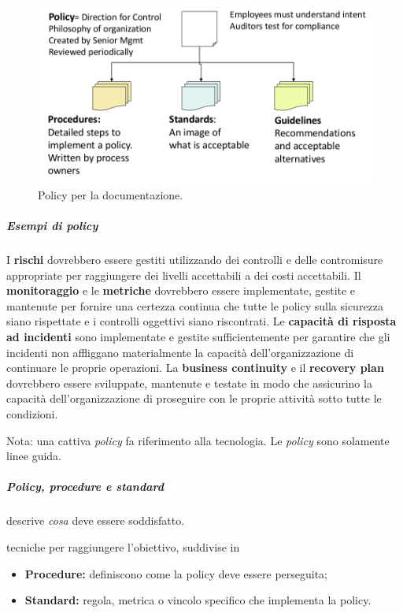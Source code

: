 \begin{figure}[h!]
        \begin{center}
                \includegraphics[scale=0.4]{res/img/documentation_policy}
        \end{center}
        \caption{Policy per la documentazione.}
\end{figure}

\subparagraph{Esempi di policy}

I \textbf{rischi} dovrebbero essere gestiti utilizzando dei controlli e delle 
contromisure appropriate per raggiungere dei livelli accettabili a dei costi 
accettabili. Il \textbf{monitoraggio} e le \textbf{metriche} dovrebbero essere 
implementate, gestite e mantenute per fornire una certezza continua che tutte 
le policy sulla sicurezza siano rispettate e i controlli oggettivi siano 
riscontrati. Le \textbf{capacità di risposta ad incidenti} sono implementate e 
gestite sufficientemente per garantire che gli incidenti non affliggano materialmente 
la capacità dell'organizzazione di continuare le proprie operazioni. 
La \textbf{business continuity} e il \textbf{recovery plan} dovrebbero essere 
sviluppate, mantenute e testate in modo che assicurino la capacità dell'organizzazione 
di proseguire con le proprie attività sotto tutte le condizioni.

Nota: una cattiva \textit{policy} fa riferimento alla tecnologia. Le 
\textit{policy} sono solamente linee guida.

\subparagraph{Policy, procedure e standard}

 descrive \textit{cosa} deve essere soddisfatto.

 tecniche per raggiungere l'obiettivo, suddivise in
\begin{itemize}
\item \textbf{Procedure:} definiscono come la policy deve essere perseguita;
\item \textbf{Standard:} regola, metrica o vincolo specifico che implementa la policy.
\end{itemize}

